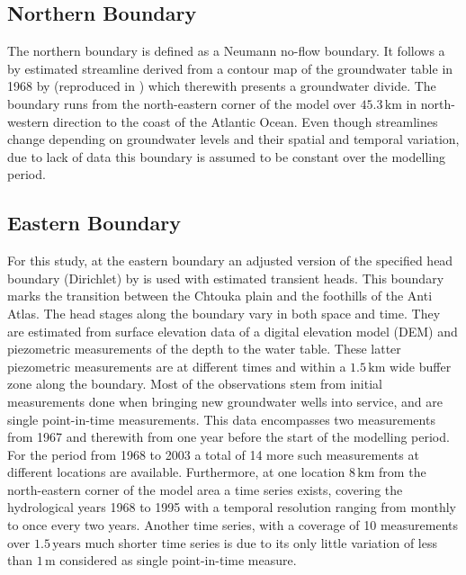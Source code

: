 \subsection{Northern Boundary}

The northern boundary is defined as a Neumann no-flow boundary. It follows a by \cite{Horn.2021} estimated streamline derived from a contour map of the groundwater table in 1968 by \textcite{Bernet.1968} (reproduced in \textcite{Bernet.1977}) which therewith presents a groundwater divide. The boundary runs from the north-eastern corner of the model over $45.3 \, \textrm{km}$ in north-western direction to the coast of the Atlantic Ocean. Even though streamlines change depending on groundwater levels and their spatial and temporal variation, due to lack of data this boundary is assumed to be constant over the modelling period.

\subsection{Eastern Boundary}

For this study, at the eastern boundary an adjusted version of the specified head boundary (Dirichlet) by \cite{Horn.2021} is used with estimated transient heads. This boundary marks the transition between the Chtouka plain and the foothills of the Anti Atlas. The head stages along the boundary vary in both space and time. They are estimated from surface elevation data of a digital elevation model (DEM) \parencite{NASA.SRTM1Arc} and piezometric measurements of the depth to the water table. These latter piezometric measurements are at different times and within a $1.5 \, \textrm{km}$ wide buffer zone along the boundary. Most of the observations stem from initial measurements done when bringing new groundwater wells into service, and are single point-in-time measurements. This data encompasses two measurements from 1967 and therewith from one year before the start of the modelling period. For the period from 1968 to 2003 a total of 14 more such measurements at different locations are available. Furthermore, at one location $8 \, \textrm{km}$ from the north-eastern corner of the model area a time series exists, covering the hydrological years 1968 to 1995 with a temporal resolution ranging from monthly to once every two years. Another time series, with a coverage of 10 measurements over $1.5 \, \textrm{years}$ much shorter time series is due to its only little variation of less than $1 \, \textrm{m}$ considered as single point-in-time measure.

